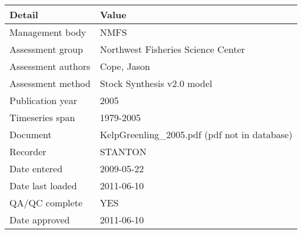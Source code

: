 \begin{table}[htb]
\centering
\begin{tabular}{lp{7cm}}
\toprule
Detail & Value \\
\midrule
Management body    & NMFS                                          \\
Assessment group   & Northwest Fisheries Science Center            \\
Assessment authors & Cope, Jason                                   \\
Assessment method  & Stock Synthesis v2.0 model                    \\
Publication year   & 2005                                          \\
Timeseries span    & 1979-2005                                     \\
Document           & KelpGreenling\_2005.pdf (pdf not in database) \\
Recorder           & STANTON                                       \\
Date entered       & 2009-05-22                                    \\
Date last loaded   & 2011-06-10                                    \\
QA/QC complete     & YES                                           \\
Date approved      & 2011-06-10                                    \\
\bottomrule
\end{tabular}
\label{tab:assessdet}
\end{table}
